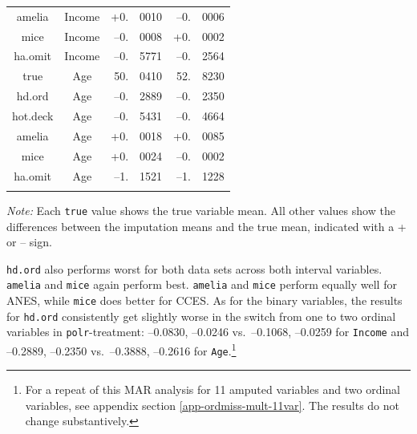 \documentclass[12pt,econ]{sources/authesis}
\begin{document}
\begin{table}[!htbp]
\begin{threeparttable}
\begin{tabular}{ccr@{}lr@{}l}
 amelia & Income & +0.&0010 & --0.&0006 \\
 mice & Income & --0.&0008 & +0.&0002 \\
 ha.omit & Income & --0.&5771 & --0.&2564 \\
 true & Age & 50.&0410 & 52.&8230 \\
 hd.ord & Age & --0.&2889 & --0.&2350 \\
 hot.deck & Age & --0.&5431 & --0.&4664 \\
 amelia & Age & +0.&0018 & +0.&0085 \\
 mice & Age & +0.&0024 & --0.&0002 \\ 
 ha.omit & Age & --1.&1521 & --1.&1228 \\
 \hline \\[-1.8ex] 
\end{tabular} 
\begin{tablenotes}
\footnotesize{\textit{Note:} Each \texttt{true} value shows the true variable mean. All other values show the differences between the imputation means and the true mean, indicated with a + or -- sign.}
\end{tablenotes}
\end{threeparttable}
\end{table}
\texttt{hd.ord} also performs worst for both data sets across both interval variables. \texttt{amelia} and \texttt{mice} again perform best. \texttt{amelia} and \texttt{mice} perform equally well for ANES, while \texttt{mice} does better for CCES. As for the binary variables, the results for \texttt{hd.ord} consistently get slightly worse in the switch from one to two ordinal variables in \texttt{polr}-treatment: --0.0830, --0.0246 vs.~--0.1068, --0.0259 for \texttt{Income} and --0.2889, --0.2350 vs.~--0.3888, --0.2616 for \texttt{Age}.\footnote{For a repeat of this MAR analysis for 11 amputed variables and two ordinal variables, see appendix section \ref{app-ordmiss-mult-11var}. The results do not change substantively.}
\end{document}

